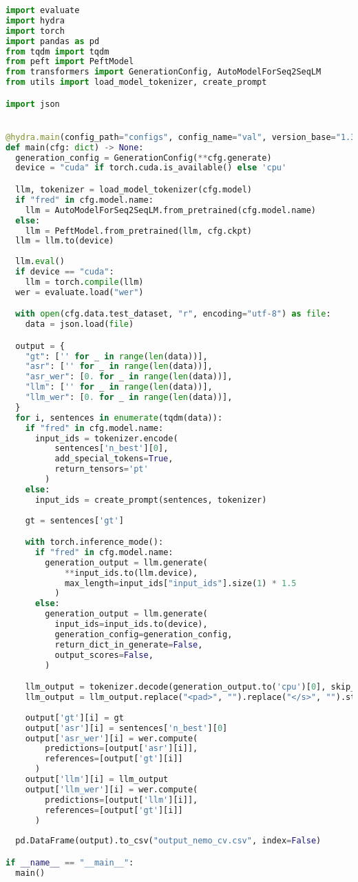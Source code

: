\begin{lstlisting}[language=Python,label={lst:eval},caption=eval.py,breaklines=true,]
import evaluate
import hydra
import torch
import pandas as pd
from tqdm import tqdm
from peft import PeftModel
from transformers import GenerationConfig, AutoModelForSeq2SeqLM
from utils import load_model_tokenizer, create_prompt

import json


@hydra.main(config_path="configs", config_name="val", version_base="1.3")
def main(cfg: dict) -> None:
  generation_config = GenerationConfig(**cfg.generate)
  device = "cuda" if torch.cuda.is_available() else 'cpu'

  llm, tokenizer = load_model_tokenizer(cfg.model)
  if "fred" in cfg.model.name:
    llm = AutoModelForSeq2SeqLM.from_pretrained(cfg.model.name)
  else:
    llm = PeftModel.from_pretrained(llm, cfg.ckpt)
  llm = llm.to(device)
  
  llm.eval()
  if device == "cuda":
    llm = torch.compile(llm)
  wer = evaluate.load("wer")

  with open(cfg.data.test_dataset, "r", encoding="utf-8") as file:
    data = json.load(file)

  output = {
    "gt": ['' for _ in range(len(data))],
    "asr": ['' for _ in range(len(data))],
    "asr_wer": [0. for _ in range(len(data))],
    "llm": ['' for _ in range(len(data))],
    "llm_wer": [0. for _ in range(len(data))],
  }
  for i, sentences in enumerate(tqdm(data)):
    if "fred" in cfg.model.name:
      input_ids = tokenizer.encode(
          sentences['n_best'][0],
          add_special_tokens=True,
          return_tensors='pt'
        )
    else:
      input_ids = create_prompt(sentences, tokenizer)
    
    gt = sentences['gt']

    with torch.inference_mode():
      if "fred" in cfg.model.name:
        generation_output = llm.generate(
            **input_ids.to(llm.device),
            max_length=input_ids["input_ids"].size(1) * 1.5
          )
      else:
        generation_output = llm.generate(
          input_ids=input_ids.to(device),
          generation_config=generation_config,
          return_dict_in_generate=False,
          output_scores=False,
        )

    llm_output = tokenizer.decode(generation_output.to('cpu')[0], skip_special=True)
    llm_output = llm_output.replace("<pad>", "").replace("</s>", "").strip()
    
    output['gt'][i] = gt
    output['asr'][i] = sentences['n_best'][0]
    output['asr_wer'][i] = wer.compute(
        predictions=[output['asr'][i]],
        references=[output['gt'][i]]
      )
    output['llm'][i] = llm_output
    output['llm_wer'][i] = wer.compute(
        predictions=[output['llm'][i]],
        references=[output['gt'][i]]
      )
  
  pd.DataFrame(output).to_csv("output_nemo_cv.csv", index=False)

if __name__ == "__main__":
  main()
\end{lstlisting}

